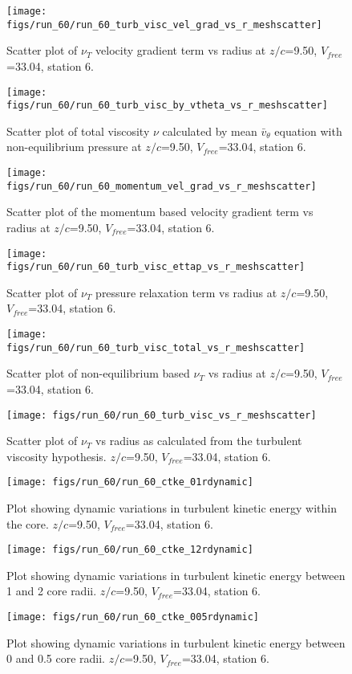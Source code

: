 \begin{figure}[H]
\centering
\texttt{[image: figs/run\_60/run\_60\_turb\_visc\_vel\_grad\_vs\_r\_meshscatter]}
\caption{Scatter plot of $\nu_T$ velocity gradient term vs radius at $z/c$=9.50, $V_{free}$=33.04, station 6.}
\end{figure}


\begin{figure}[H]
\centering
\texttt{[image: figs/run\_60/run\_60\_turb\_visc\_by\_vtheta\_vs\_r\_meshscatter]}
\caption{Scatter plot of total viscosity $\nu$ calculated by mean $\bar{v}_{\theta}$ equation with non-equilibrium pressure at $z/c$=9.50, $V_{free}$=33.04, station 6.}
\end{figure}


\begin{figure}[H]
\centering
\texttt{[image: figs/run\_60/run\_60\_momentum\_vel\_grad\_vs\_r\_meshscatter]}
\caption{Scatter plot of the momentum based velocity gradient term vs radius at $z/c$=9.50, $V_{free}$=33.04, station 6.}
\end{figure}


\begin{figure}[H]
\centering
\texttt{[image: figs/run\_60/run\_60\_turb\_visc\_ettap\_vs\_r\_meshscatter]}
\caption{Scatter plot of $\nu_T$ pressure relaxation term vs radius at $z/c$=9.50, $V_{free}$=33.04, station 6.}
\end{figure}


\begin{figure}[H]
\centering
\texttt{[image: figs/run\_60/run\_60\_turb\_visc\_total\_vs\_r\_meshscatter]}
\caption{Scatter plot of non-equilibrium based $\nu_T$ vs radius at $z/c$=9.50, $V_{free}$=33.04, station 6.}
\end{figure}


\begin{figure}[H]
\centering
\texttt{[image: figs/run\_60/run\_60\_turb\_visc\_vs\_r\_meshscatter]}
\caption{Scatter plot of $\nu_T$ vs radius as calculated from the turbulent viscosity hypothesis. $z/c$=9.50, $V_{free}$=33.04, station 6.}
\end{figure}


\begin{figure}[H]
\centering
\texttt{[image: figs/run\_60/run\_60\_ctke\_01rdynamic]}
\caption{Plot showing dynamic variations in turbulent kinetic energy within the core. $z/c$=9.50, $V_{free}$=33.04, station 6.}
\end{figure}


\begin{figure}[H]
\centering
\texttt{[image: figs/run\_60/run\_60\_ctke\_12rdynamic]}
\caption{Plot showing dynamic variations in turbulent kinetic energy between 1 and 2 core radii. $z/c$=9.50, $V_{free}$=33.04, station 6.}
\end{figure}


\begin{figure}[H]
\centering
\texttt{[image: figs/run\_60/run\_60\_ctke\_005rdynamic]}
\caption{Plot showing dynamic variations in turbulent kinetic energy between 0 and 0.5 core radii. $z/c$=9.50, $V_{free}$=33.04, station 6.}
\end{figure}


